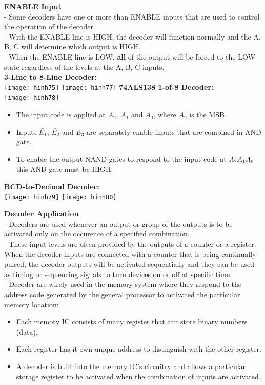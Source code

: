 \documentclass[12pt]{article}
\begin{document}
\textbf{ENABLE Input} \\
- Some decoders have one or more than ENABLE inputs that are used to control the operation of the decoder. \\
- With the ENABLE line is HIGH, the decoder will function normally and the A, B, C will determine which output is HIGH. \\
- When the ENABLE line is LOW, \textbf{all} of the output will be forced to the LOW state regardless of the levels at the A, B, C inputs. \\
\bigbreak
\textbf{3-Line to 8-Line Decoder: } \\
\texttt{[image: hinh75]}
\bigbreak
\texttt{[image: hinh77]}
\bigbreak
\textbf{74ALS138 1-of-8 Decoder: } \\
\texttt{[image: hinh78]}
\bigbreak
\begin{itemize}
	\item The input code is applied at $A_{2}$, $A_{1}$ and $A_{0}$, where $A_{2}$ is the MSB.
	\item Inputs $\bar{E_{1}}$, $\bar{E_{2}}$ and $E_{3}$ are separately enable inputs that are combined in AND gate. 
	\item To enable the output NAND gates to respond to the input code at $A_{2} A_{1} A_{0}$ this AND gate must be HIGH.
\end{itemize}
\bigbreak
\textbf{BCD-to-Decimal Decoder: } \\
\texttt{[image: hinh79]}
\bigbreak
\texttt{[image: hinh80]}
\bigbreak 

\textbf{Decoder Application} \\
- Decoders are used whenever an output or group of the outputs is to be activated only on the occurence of a specified combination. \\
- These input levels are often provided by the outputs of a counter or a register. When the decoder inputs are connected with a counter that is being continually pulsed, the decoder outputs will be activated sequentially and they can be used as timing or sequencing signals to turn devices on or off at specific time. \\
- Decoder are wirely used in the memory system where they respond to the address code generated by the general processor to activated the particular memory location: \\
\begin{itemize}
	\item Each memory IC consists of many register that can store binary numbers (data).
	\item Each register has it own unique address to distinguish with the other register.
	\item A decoder is built into the memory IC's circuitry and allows a particular storage register to be activated when the combination of inputs are activated.
\end{itemize}
\end{document}
